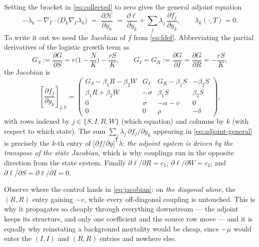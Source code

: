 \documentclass[11pt]{article}
\newcommand{\Grad}{\nabla_\Gamma}
\newcommand{\Div}{\nabla_\Gamma\cdot}
\newcommand{\Ham}{\mathcal{H}}
\begin{document}
Setting the bracket in \eqref{eq:collected} to zero gives the general adjoint equation
\begin{equation}
-\dot\lambda_k - \Div\big(D_k\Grad\lambda_k\big) \;=\; \frac{\partial\Ham}{\partial y_k}
\;=\; \frac{\partial \ell}{\partial y_k} + \sum_{j}\lambda_j\,\frac{\partial f_j}{\partial y_k},
\qquad \lambda_k(\cdot,T)=0.
\label{eq:adjoint-general}
\end{equation}
To write it out we need the Jacobian of $f$ from \eqref{eq:fdef}. Abbreviating the partial derivatives of the logistic growth term as
\begin{equation}
G_S := \frac{\partial G}{\partial S} = r\Big(1-\frac{N}{K}\Big) - \frac{rS}{K},
\qquad
G_I = G_R := \frac{\partial G}{\partial I} = \frac{\partial G}{\partial R} = -\frac{rS}{K},
\label{eq:Gderivs}
\end{equation}
the Jacobian is
\begin{equation}
\left[\frac{\partial f_j}{\partial y_k}\right]_{j,k}
=
\begin{pmatrix}
G_S - \beta_1 R - \beta_2 W & G_I & G_R - \beta_1 S & -\beta_2 S\\[2pt]
\beta_1 R + \beta_2 W & -\sigma & \beta_1 S & \beta_2 S\\[2pt]
0 & \sigma & -\alpha - v & 0\\[2pt]
0 & 0 & \rho & -\delta
\end{pmatrix},
\label{eq:jacobian}
\end{equation}
with rows indexed by $j\in\{S,I,R,W\}$ (which equation) and columns by $k$ (with respect to which state). The sum $\sum_j\lambda_j\,\partial f_j/\partial y_k$ appearing in \eqref{eq:adjoint-general} is precisely the $k$-th entry of $\big[\partial f/\partial y\big]^{\mathsf T}\lambda$: \emph{the adjoint system is driven by the transpose of the state Jacobian}, which is why couplings run in the opposite direction from the state system. Finally $\partial\ell/\partial R = c_1$, $\partial\ell/\partial W = c_2$, and $\partial\ell/\partial S = \partial\ell/\partial I = 0$.

Observe where the control lands in \eqref{eq:jacobian}: on \emph{the diagonal alone}, the $(R,R)$ entry gaining $-v$, while every off-diagonal coupling is untouched. This is why it propagates so cheaply through everything downstream --- the adjoint keeps its structure, and only one coefficient and the source row move --- and it is equally why reinstating a background mortality would be cheap, since $-\mu$ would enter the $(I,I)$ and $(R,R)$ entries and nowhere else.
\end{document}
